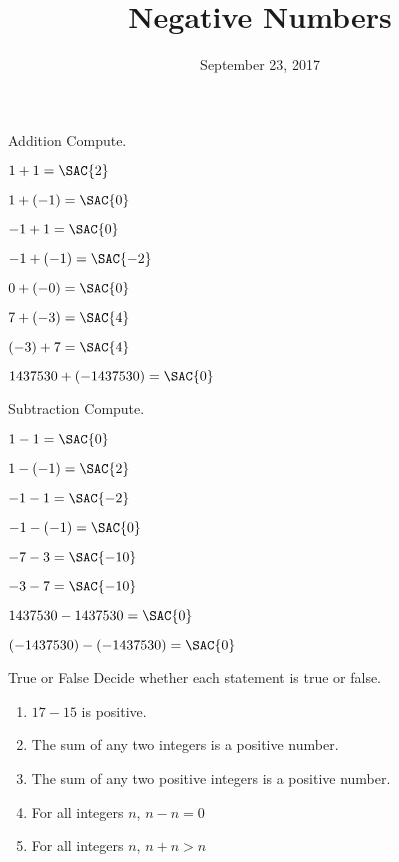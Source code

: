 \documentclass[12pt,letterpaper]{article}
\title{Negative Numbers}
\date{September 23, 2017}
\begin{document}
\maketitle

\thispagestyle{empty}

\begin{problem}{Addition}
  Compute.

  \begin{itemize}
    \begin{multicols}{2}
      \item \(1 + 1 = \SAC{2}\)
      \item \(1 + (-1) = \SAC{0}\)
      \item \(-1 + 1 = \SAC{0}\)
      \item \(-1 + (-1) = \SAC{-2}\)
      \item \(0 + (-0) = \SAC{0}\)
      \item \(7 + (-3) = \SAC{4}\)
      \item \((-3) + 7 = \SAC{4}\)
      \item \(1437530 + (-1437530) = \SAC{0}\)
    \end{multicols}
  \end{itemize}
\end{problem}

\begin{problem}{Subtraction}
  Compute.

  \begin{itemize}
    \begin{multicols}{2}
      \item \(1 - 1 = \SAC{0}\)
      \item \(1 - (-1) = \SAC{2}\)
      \item \(-1 - 1 = \SAC{-2}\)
      \item \(-1 - (-1) = \SAC{0}\)
      \item \(-7 - 3 = \SAC{-10}\)
      \item \(-3 - 7 = \SAC{-10}\)
      \item \(1437530 - 1437530 = \SAC{0}\)
      \item \((-1437530) - (-1437530) = \SAC{0}\)
    \end{multicols}
  \end{itemize}
\end{problem}

\begin{problem}{True or False}
  Decide whether each statement is true or false.

  \begin{enumerate}
    \item \(17 - 15\) is positive. \hfill \TFTrue
    \item The sum of any two integers is a positive number. \hfill \TFFalse
    \item The sum of any two positive integers is a positive number.
    \hfill \TFTrue
    \item For all integers \(n\), \(n - n = 0\) \hfill \TFTrue
    \item For all integers \(n\), \(n + n > n\) \hfill \TFFalse
  \end{enumerate}
\end{problem}
\end{document}
